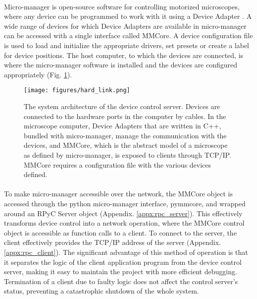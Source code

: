 \paragraph*{} Micro-manager is open-source software for controlling motorized microscopes, where any device can be programmed to work with it using a Device Adapter \cite{edelstein2014advanced}. A wide range of devices for which Device Adapters are available in micro-manager can be accessed with a single interface called MMCore. A device configuration file is used to load and initialize the appropriate drivers, set presets or create a label for device positions. The host computer, to which the devices are connected, is where the micro-manager software is installed and the devices are configured appropriately (Fig. \ref{fig:hard_link}).

 \begin{figure}[h]
    {\hfill\texttt{[image: figures/hard\_link.png]}\hspace*{\fill}}
    \caption{The system architecture of the device control server. Devices are connected to the hardware ports in the computer by cables. In the microscope computer, Device Adapters that are written in C++, bundled with micro-manager, manage the communication with the devices, and MMCore, which is the abstract model of a microscope as defined by micro-manager, is exposed to clients through TCP/IP. MMCore requires a configuration file with the various devices defined.}
    {\label{fig:hard_link}}
\end{figure}

\paragraph*{} To make micro-manager accessible over the network, the MMCore object is accessed through the python micro-manager interface, pymmcore, and wrapped around an RPyC Server object (Appendix. \ref{appx:rpc_server}). This effectively transforms device control into a network operation, where the MMCore control object is accessible as function calls to a client. To connect to the server, the client effectively provides the TCP/IP address of the server (Appendix. \ref{appx:rpc_client}). The significant advantage of this method of operation is that it separates the logic of the client application program from the device control server, making it easy to maintain the project with more efficient debugging. Termination of a client due to faulty logic does not affect the control server's status, preventing a catastrophic shutdown of the whole system.

